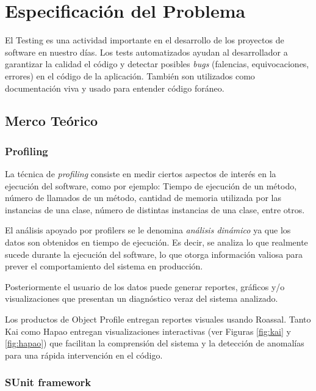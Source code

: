 \chapter{Especificación del Problema}

\par El Testing es una actividad importante en el desarrollo de los proyectos de software en nuestro días. Los tests automatizados ayudan al desarrollador a garantizar la calidad el código y detectar posibles \emph{bugs} (falencias, equivocaciones, errores) en el código de la aplicación. También son utilizados como documentación viva y usado para entender código foráneo.



\section{Merco Teórico}


\subsection{Profiling}
\par La técnica de \emph{profiling} consiste en medir ciertos aspectos de interés en la ejecución del software, como por ejemplo: Tiempo de ejecución de un método, número de llamados de un método, cantidad de memoria utilizada por las instancias de una clase, número de distintas instancias de una clase, entre otros. 
\par El análisis apoyado por profilers se le denomina \emph{análisis dinámico} ya que los datos son obtenidos en tiempo de ejecución. Es decir, se analiza lo que realmente sucede durante la ejecución del software, lo que otorga información valiosa para prever el comportamiento del sistema en producción.
\par Posteriormente el usuario de los datos puede generar reportes, gráficos y/o visualizaciones que presentan un diagnóstico veraz del sistema analizado. 
\par Los productos de Object Profile  entregan reportes visuales usando Roassal. Tanto Kai como Hapao entregan visualizaciones interactivas (ver Figuras \ref{fig:kai} y \ref{fig:hapao}) que facilitan la comprensión del sistema y la detección de anomalías para una rápida intervención en el código.

\subsection{SUnit framework}

